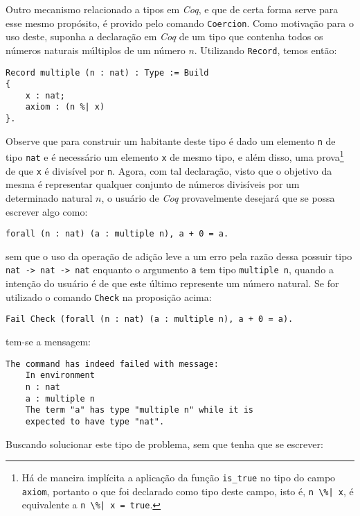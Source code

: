 Outro mecanismo relacionado a tipos em \textit{Coq}, e que de certa forma serve para esse mesmo propósito, é provido pelo comando \lstinline[language = coq]$Coercion$. Como motivação para o uso deste, suponha a declaração em \textit{Coq} de um tipo que contenha todos os números naturais múltiplos de um número $n$. Utilizando \lstinline[language = coq]$Record$, temos então: 
\begin{lstlisting}[language = coq]
Record multiple (n : nat) : Type := Build
{       
    x : nat;
    axiom : (n %| x)        
}.
\end{lstlisting}
Observe que para construir um habitante deste tipo é dado um elemento \lstinline[language = coq]$n$ de tipo \lstinline[language = coq]$nat$ e é necessário um elemento \lstinline[language = coq]$x$ de mesmo tipo, e além disso, uma prova\footnote{Há de maneira implícita a aplicação da função \lstinline[language = coq]$is_true$ no tipo do campo \lstinline[language = coq]$axiom$, portanto o que foi declarado como tipo deste campo, isto é, \lstinline[language = coq]$n \%| x$, é equivalente a \lstinline[language = coq]$n \%| x = true$.} de que \lstinline[language = coq]$x$ é divisível por \lstinline[language = coq]$n$.
Agora, com tal declaração, visto que o objetivo da mesma é representar qualquer conjunto de números divisíveis por um determinado natural $n$, o usuário de \textit{Coq} provavelmente desejará que se possa escrever algo como:
\begin{lstlisting}[language = coq]
    forall (n : nat) (a : multiple n), a + 0 = a.
\end{lstlisting}
sem que o uso da operação de adição leve a um erro pela razão dessa possuir tipo \lstinline[language = coq]$nat -> nat -> nat$ enquanto o argumento \lstinline[language = coq]$a$ tem tipo \lstinline[language = coq]$multiple n$, quando a intenção do usuário é de que este último represente um número natural. Se for utilizado o comando \lstinline[language = coq]$Check$ na proposição acima:
\begin{lstlisting}[language = coq]
    Fail Check (forall (n : nat) (a : multiple n), a + 0 = a).
\end{lstlisting}
tem-se a mensagem:
\begin{lstlisting}[language = coq-error]
    The command has indeed failed with message:
    In environment
    n : nat
    a : multiple n
    The term "a" has type "multiple n" while it is
    expected to have type "nat".
\end{lstlisting}
Buscando solucionar este tipo de problema, sem que tenha que se escrever:

